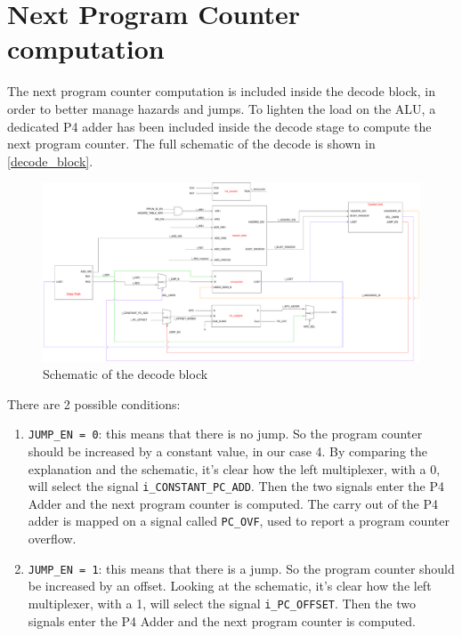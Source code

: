 \section{Next Program Counter computation}
The next program counter computation is included inside the decode block, in order to better manage hazards and jumps. To lighten the load on the ALU, a dedicated P4 adder has been included inside the decode stage to compute the next program counter. 
The full schematic of the decode is shown in \autoref{decode_block}.

\begin{figure}[H]
	\centering
  \addtolength{\leftskip}{-3cm}
  \addtolength{\rightskip}{-3cm}
	\includegraphics[width=1.2\textwidth]{chapters/4_DecodeStage/images/decode_block.pdf}
	\caption{Schematic of the decode block}
	\label{decode_block}
\end{figure}

There are 2 possible conditions:

\begin{enumerate}
  \item \texttt{JUMP\_EN = 0}: this means that there is no jump. So the program counter should be increased by a constant value, in our case 4. By comparing the explanation and the schematic, it's clear how the left multiplexer, with a 0, will select the signal \texttt{i\_CONSTANT\_PC\_ADD}. Then the two signals enter the P4 Adder and the next program counter is computed. The carry out of the P4 adder is mapped on a signal called \texttt{PC\_OVF}, used to report a program counter overflow. 
  \item \texttt{JUMP\_EN = 1}: this means that there is a jump. So the program counter should be increased by an offset. Looking at the schematic, it's clear how the left multiplexer, with a 1, will select the signal \texttt{i\_PC\_OFFSET}. Then the two signals enter the P4 Adder and the next program counter is computed. 
\end{enumerate}

